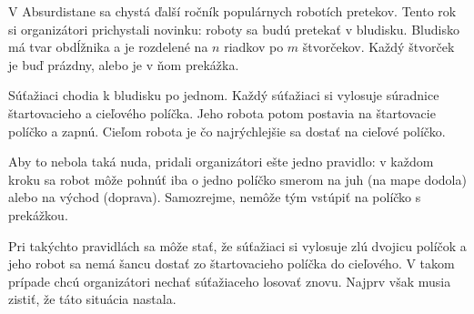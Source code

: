 
\usepackage[slovak]{babel}





V Absurdistane sa chystá ďalší ročník populárnych robotích pretekov. Tento rok
si organizátori prichystali novinku: roboty sa budú pretekať v bludisku. Bludisko
má tvar obdĺžnika a je rozdelené na $n$ riadkov po $m$ štvorčekov.
Každý štvorček je buď prázdny, alebo je v ňom prekážka.


Súťažiaci chodia k bludisku po jednom. Každý súťažiaci si vylosuje súradnice
štartovacieho a cieľového políčka. Jeho robota potom postavia na štartovacie políčko
a zapnú. Cieľom robota je čo najrýchlejšie sa dostať na cieľové políčko.


Aby to nebola taká nuda,
pridali organizátori ešte jedno pravidlo: v každom kroku sa robot môže pohnúť iba o jedno
políčko smerom na juh (na mape dodola) alebo na východ (doprava). Samozrejme, nemôže tým 
vstúpiť na políčko s prekážkou.



Pri takýchto pravidlách sa môže stať, že súťažiaci si vylosuje zlú dvojicu políčok
a jeho robot sa nemá šancu dostať zo štartovacieho políčka do cieľového. V takom prípade
chcú organizátori nechať súťažiaceho losovať znovu. Najprv však musia zistiť, že táto
situácia nastala.

